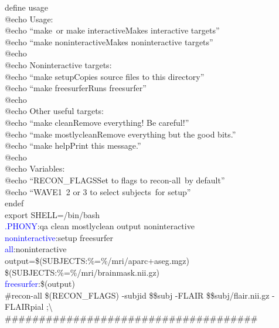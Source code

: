 \documentclass[oneside,11pt]{memoir}
\newcommand{\maker}[2]{\textcolor{blue}{#1}:\enspace#2}
\newcommand{\tab}{\hspace*{4em}}
\begin{document}
define usage \\
@echo Usage: \\
@echo ``make\, or make interactive\tab Makes interactive targets'' \\ 
@echo ``make noninteractive\tab \tab Makes noninteractive targets'' \\ 
@echo \\
@echo Noninteractive targets: \\
@echo ``make setup\tab \tab \tab Copies source files to this directory'' \\ 
@echo ``make freesurfer\tab \tab Runs freesurfer'' \\ 
@echo \\
@echo Other useful targets: \\
@echo ``make clean\tab \tab \tab Remove everything! Be careful!'' \\ 
@echo ``make mostlyclean\tab \tab Remove everything but the good bits.'' \\ 
@echo ``make help\tab \tab \tab Print this message.'' \\ 
@echo \\
@echo Variables: \\
@echo ``RECON_FLAGS\tab \tab \tab Set to flags to recon-all\, by default'' \\ 
@echo ``WAVE\tab \tab \tab \tab 1\, 2 or 3 to select subjects\, for setup'' \\ 
endef \\
	
export SHELL=/bin/bash \\

\maker{.PHONY}{qa clean mostlyclean output noninteractive} \\

\maker{noninteractive}{setup freesurfer} \\

\maker{all}{noninteractive} \\
	
output=\$(SUBJECTS:\%=\%/mri/aparc+aseg.mgz) \$(SUBJECTS:\%=\%/mri/brainmask.nii.gz) \\
\maker{freesurfer}{\$(output)} \\
	
\#recon-all \$(RECON_FLAGS) -subjid  \$\${subj} -FLAIR \$\${subj}/flair.nii.gz -FLAIRpial ;\textbackslash \\
	
\#\#\#\#\#\#\#\#\#\#\#\#\#\#\#\#\#\#\#\#\#\#\#\#\#\#\#\#\#\#\#\#\#\#\#\#\# \\
	
\end{document}
